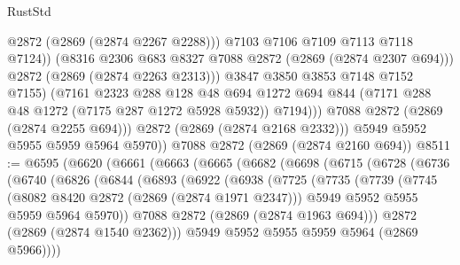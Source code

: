 \begin{lexlean}{RustStd}
\begin{coremodule}
                          @2872
                          (@2869 (@2874 @2267 @2288)))
                        @7103
                        @7106
                        @7109
                        @7113
                        @7118
                        @7124))
                    (@8316 @2306 @683 @8327 @7088 @2872 (@2869 (@2874 @2307 @694)))
                    @2872
                    (@2869 (@2874 @2263 @2313)))
                  @3847
                  @3850
                  @3853
                  @7148
                  @7152
                  @7155)
                (@7161
                  @2323
                  @288
                  @128
                  @48
                  @694
                  @1272
                  @694
                  @844
                  (@7171 @288 @48 @1272 (@7175 @287 @1272 @5928 @5932))
                  @7194)))
            @7088
            @2872
            (@2869 (@2874 @2255 @694)))
          @2872
          (@2869 (@2874 @2168 @2332)))
        @5949
        @5952
        @5955
        @5959
        @5964
        @5970))
    @7088
    @2872
    (@2869 (@2874 @2160 @694))
@8511 := @6595
    (@6620
      (@6661
        (@6663
          (@6665
            (@6682
              (@6698
                (@6715
                  (@6728
                    (@6736
                      (@6740
                        (@6826
                          (@6844
                            (@6893
                              (@6922
                                (@6938
                                  (@7725
                                    (@7735
                                      (@7739
                                        (@7745
                                          (@8082 @8420 @2872 (@2869 (@2874 @1971 @2347)))
                                          @5949
                                          @5952
                                          @5955
                                          @5959
                                          @5964
                                          @5970))
                                      @7088
                                      @2872
                                      (@2869 (@2874 @1963 @694)))
                                    @2872
                                    (@2869 (@2874 @1540 @2362)))
                                  @5949
                                  @5952
                                  @5955
                                  @5959
                                  @5964
                                  (@2869 @5966))))

\end{coremodule}
\end{lexlean}
